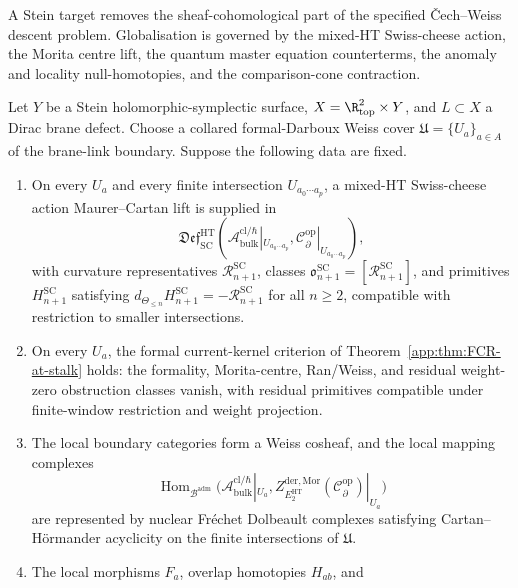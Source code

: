 A Stein target removes the sheaf-cohomological part of the specified
\v Cech--Weiss descent problem.  Globalisation is governed by the
mixed-HT Swiss-cheese action, the Morita centre lift, the quantum master
equation counterterms, the anomaly and locality null-homotopies, and the
comparison-cone contraction.

\begin{thm}\label{app:thm:stein-global-deligne}
Let \(Y\) be a Stein holomorphic-symplectic surface,
\(X=\R^2_{\mathrm{top}}\times Y\), and \(L\subset X\) a Dirac brane
defect.  Choose a collared formal-Darboux Weiss cover
\(\mathfrak U=\{U_a\}_{a\in A}\) of the brane-link boundary.  Suppose the
following data are fixed.
\begin{enumerate}[label=\textup{(S\arabic*)}]
\item On every \(U_a\) and every finite intersection
  \(U_{a_0\cdots a_p}\), a mixed-HT Swiss-cheese action
  Maurer--Cartan lift is supplied in
  \[
    \mathfrak{Def}^{\mathrm{HT}}_{\mathrm{SC}}\!
    \left(
	    \mathcal A^{\mathrm{cl}/\hbar}_{\mathrm{bulk}}|_{U_{a_0\cdots a_p}},
	    \mathcal C^{\mathrm{op}}_\partial|_{U_{a_0\cdots a_p}}
	    \right),
	  \]
	  with curvature representatives
	  \(\mathcal R^{\mathrm{SC}}_{n+1}\), classes
	  \(\mathfrak o^{\mathrm{SC}}_{n+1}
	  =[\mathcal R^{\mathrm{SC}}_{n+1}]\), and primitives
	  \(H^{\mathrm{SC}}_{n+1}\) satisfying
	  \(d_{\Theta_{\le n}}H^{\mathrm{SC}}_{n+1}
	  =-\mathcal R^{\mathrm{SC}}_{n+1}\) for all \(n\ge2\), compatible
	  with restriction to smaller intersections.
\item On every \(U_a\), the formal current-kernel criterion of
  Theorem~\ref{app:thm:FCR-at-stalk} holds: the formality,
  Morita-centre, Ran/Weiss, and residual weight-zero obstruction classes
  vanish, with residual primitives compatible under finite-window
  restriction and weight projection.
\item The local boundary categories form a Weiss cosheaf, and the local
  mapping complexes
  \[
    \operatorname{Hom}_{\mathcal B^{\mathrm{adm}}}
    \bigl(\mathcal A^{\mathrm{cl}/\hbar}_{\mathrm{bulk}}|_{U_a},
    Z^{\mathrm{der},\mathrm{Mor}}_{E_2^{\mathrm{HT}}}
      (\mathcal C^{\mathrm{op}}_\partial)|_{U_a}\bigr)
  \]
  are represented by nuclear Fr\'echet Dolbeault complexes satisfying
  Cartan--H\"ormander acyclicity on the finite intersections of
  \(\mathfrak U\).
\item The local morphisms \(F_a\), overlap homotopies \(H_{ab}\), and

\end{enumerate}
\end{thm}
